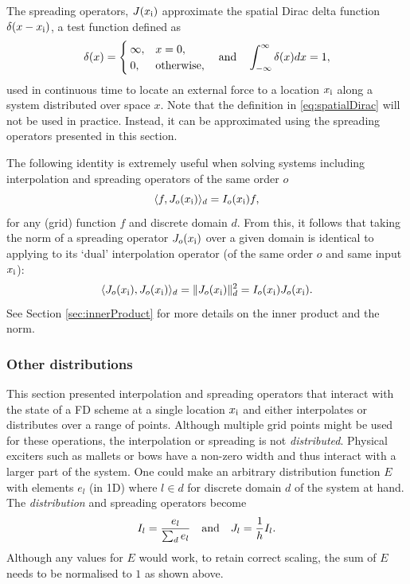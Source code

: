 The spreading operators, $J(x_{\text{i}})$ approximate the spatial Dirac delta function $\delta(x-x_{\text{i}})$, a test function defined as
\begin{equation}\label{eq:spatialDirac}
    \delta(x)= \begin{cases}
        \infty, & x = 0,\\
        0, & \text{otherwise},
    \end{cases} \quad \text{and} \quad \int_{-\infty}^{\infty} \delta(x)dx = 1,
\end{equation}
used in continuous time to locate an external force to a location $x_{\text{i}}$ along a system distributed over space $x$. Note that the definition in \eqref{eq:spatialDirac} will not be used in practice. Instead, it can be approximated using the spreading operators presented in this section. 

The following identity is extremely useful when solving systems including interpolation and spreading operators of the same order $o$
\begin{equation}\label{eq:identityIJ}
    \langle f, J_o(x_{\text{i}}) \rangle_d = I_o(x_{\text{i}}) f,
\end{equation}
for any (grid) function $f$ and discrete domain $d$. From this, it follows that taking the norm of a spreading operator $J_o(x_{\text{i}})$ over a given domain is identical to applying to its `dual' interpolation operator (of the same order $o$ and same input $x_{\text{i}}$):
\begin{equation}
    \langle  J_o(x_{\text{i}}), J_o(x_{\text{i}})\rangle_d = \lVert J_o(x_{\text{i}})\rVert^2_d = I_o(x_{\text{i}})J_o(x_{\text{i}}).
\end{equation}
See Section \ref{sec:innerProduct} for more details on the inner product and the norm.

\subsubsection{Other distributions}
This section presented interpolation and spreading operators that interact with the state of a FD scheme at a single location $x_{\text{i}}$ and either interpolates or distributes over a range of points. Although multiple grid points might be used for these operations, the interpolation or spreading is not \textit{distributed}. Physical exciters such as mallets or bows have a non-zero width and thus interact with a larger part of the system. One could make an arbitrary distribution function $E$ with elements $e_l$ (in 1D) where $l\in d$ for discrete domain $d$ of the system at hand. The \textit{distribution} and spreading operators become
\begin{equation}
    I_l = \frac{e_l}{\sum_d e_l} \quad \text{and} \quad J_l = \frac{1}{h}I_l.
\end{equation}
Although any values for $E$ would work, to retain correct scaling, the sum of $E$ needs to be normalised to $1$ as shown above.


